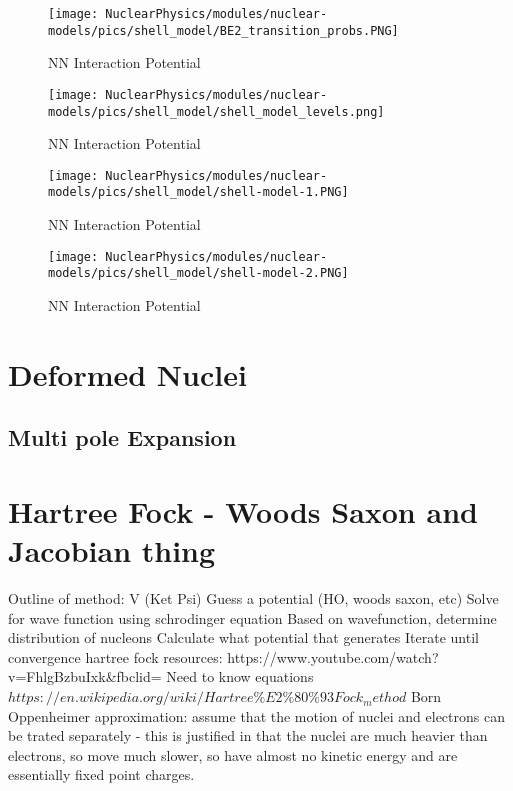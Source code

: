         \begin{figure}[H]
            \centering
            \texttt{[image: NuclearPhysics/modules/nuclear-models/pics/shell\_model/BE2\_transition\_probs.PNG]}
        \caption{NN Interaction Potential}
        \end{figure}
        
        
        
         
     \begin{figure}[H]
        \centering
        \texttt{[image: NuclearPhysics/modules/nuclear-models/pics/shell\_model/shell\_model\_levels.png]}
        \caption{NN Interaction Potential}
    \end{figure}       
    
     
     \begin{figure}[H]
        \centering
        \texttt{[image: NuclearPhysics/modules/nuclear-models/pics/shell\_model/shell-model-1.PNG]}
        \caption{NN Interaction Potential}
    \end{figure}       
        
        
         
     \begin{figure}[H]
        \centering
        \texttt{[image: NuclearPhysics/modules/nuclear-models/pics/shell\_model/shell-model-2.PNG]}
        \caption{NN Interaction Potential}
    \end{figure}       
        
        
        
        
    \section{Deformed Nuclei}
        \subsection{Multi pole Expansion}
    \section{Hartree Fock - Woods Saxon and Jacobian thing}
    Outline of method:
    V (Ket Psi)
    Guess a potential (HO, woods saxon, etc)
    Solve for wave function using schrodinger equation
    Based on wavefunction, determine distribution of nucleons
    Calculate what potential that generates
    Iterate until convergence
    hartree fock resources:
    https://www.youtube.com/watch?v=FhlgBzbuIxk&fbclid=
    Need to know equations
    $https://en.wikipedia.org/wiki/Hartree\%E2\%80\%93Fock_method$
    Born Oppenheimer approximation: assume that the motion of nuclei and electrons can be trated separately - this is justified in that the nuclei are much heavier than electrons, so move much slower, so have almost no kinetic energy and are essentially fixed point charges. 
